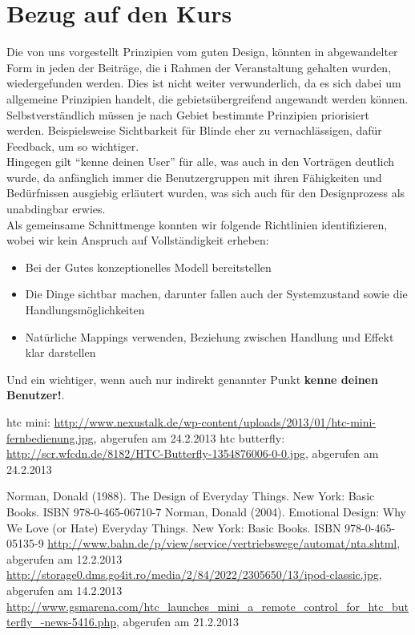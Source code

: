 \documentclass[parskip,headsepline, headtopline, %
footsepline, oneside, 12pt, headings=small]{scrreprt}
\begin{document}
\section{Bezug auf den Kurs}

Die von uns vorgestellt Prinzipien vom guten Design, könnten in abgewandelter Form in jeden der Beiträge, die i Rahmen der Veranstaltung gehalten wurden, wiedergefunden werden. Dies ist nicht weiter verwunderlich, da es sich dabei um allgemeine Prinzipien handelt, die gebietsübergreifend angewandt werden können. Selbstverständlich müssen je nach Gebiet bestimmte Prinzipien priorisiert werden. Beispielsweise Sichtbarkeit für Blinde eher zu vernachlässigen, dafür Feedback, um so wichtiger.\\
Hingegen gilt "`kenne deinen User"' für alle, was auch in den Vorträgen deutlich wurde, da anfänglich immer die Benutzergruppen mit ihren Fähigkeiten und Bedürfnissen ausgiebig erläutert wurden, was sich auch für den Designprozess als unabdingbar erwies.  \\

Als gemeinsame Schnittmenge konnten wir folgende Richtlinien identifizieren, wobei wir kein Anspruch auf Vollständigkeit erheben:
\begin{itemize}
\item Bei der Gutes konzeptionelles Modell bereitstellen
\item Die Dinge sichtbar machen, darunter fallen auch der Systemzustand sowie die Handlungsmöglichkeiten
\item Natürliche Mappings verwenden, Beziehung zwischen Handlung und Effekt klar darstellen
\end{itemize}

Und ein wichtiger, wenn auch nur indirekt genannter Punkt \textbf{kenne deinen Benutzer!}. 


htc mini: \url{http://www.nexustalk.de/wp-content/uploads/2013/01/htc-mini-fernbedienung.jpg}, abgerufen am 24.2.2013
htc butterfly: \url{http://scr.wfcdn.de/8182/HTC-Butterfly-1354876006-0-0.jpg}, abgerufen am 24.2.2013

\begin{thebibliography}{9}
	 Norman, Donald (1988). The Design of Everyday Things. New York: Basic Books. ISBN 978-0-465-06710-7 
	 Norman, Donald (2004). Emotional Design: Why We Love (or Hate) Everyday Things. New York: Basic Books. ISBN 978-0-465-05135-9
	 \url{http://www.bahn.de/p/view/service/vertriebswege/automat/nta.shtml}, abgerufen am 12.2.2013
	 \url{http://storage0.dms.go4it.ro/media/2/84/2022/2305650/13/ipod-classic.jpg}, abgerufen am 14.2.2013
	  \url{http://www.gsmarena.com/htc_launches_mini_a_remote_control_for_htc_butterfly_-news-5416.php}, abgerufen am 21.2.2013
\end{thebibliography}
\end{document}
